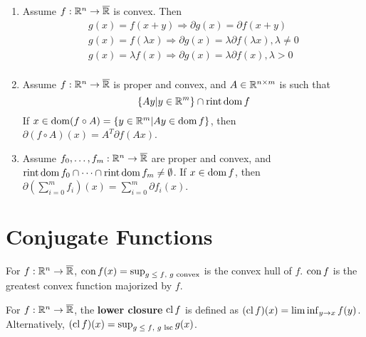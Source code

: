 \begin{thm}
  \label{sec:subgradients-11}
  \begin{enumerate}
  \item Assume $f: \mathbb{R}^{n} \rightarrow \overline {\mathbb{R}}$  is convex. Then
    \begin{align}
      \label{eq:17}
      g(x) = f(x+y) \Rightarrow \partial g(x) = \partial f(x+y) \\
      g(x) = f(\lambda x) \Rightarrow \partial g(x) = \lambda \partial
      f(\lambda x), \lambda \neq 0 \\
      \label{eq:19}
      g(x) = \lambda f(x) \Rightarrow \partial g(x) = \lambda \partial
      f(x), \lambda > 0 \\
    \end{align}
  \item Assume $f: \mathbb{R}^{n} \rightarrow \overline {\mathbb{R}}$ is proper and
    convex, and $A \in \mathbb{R}^{n \times m}$ is such that
    \begin{equation}
      \label{eq:21}
      \{ Ay | y \in \mathbb{R}^{m} \}  \cap \operatorname*{rint} \operatorname*{dom} f
    \end{equation}
    If $x \in \operatorname*{dom} (f \circ A) = \{ y \in \mathbb{R}^{m} | Ay \in \operatorname*{dom} f \} $,
    then $\partial (f \circ A)(x) = A^{T} \partial f(Ax)$.
  \item Assume $f_{0}, \dots, f_{m}: \mathbb{R}^{n} \rightarrow \overline {\mathbb{R}}$
    are proper and convex, and $\operatorname*{rint} \operatorname*{dom} f_{0} \cap \dots \cap \operatorname*{rint}
    \operatorname*{dom} f_{m} \neq \emptyset$.  If $x \in \operatorname*{dom} f$, then
    $\partial(\sum_{i=0}^{m} f_{i})(x) = \sum_{i=0}^{m} \partial f_{i}(x)$.
  \end{enumerate}
\end{thm}

\section{Conjugate Functions}
\label{sec:conjugate-functions}

\begin{defn}
  \label{sec:conjugate-functions-1}
  For $f: \mathbb{R}^{n} \rightarrow \overline {\mathbb{R}}$, $\operatorname*{con} f(x) =\sup_{\text{$g
      \leq f$, $g$ convex}}$ is the convex hull of $f$.
  $\operatorname*{con} f$ is the greatest convex function majorized by $f$.
\end{defn}

\begin{defn}
  \label{sec:conjugate-functions-2}
  For $f: \mathbb{R}^{n} \rightarrow \overline {\mathbb{R}}$, the \textbf{lower closure}
  $\operatorname*{cl} f$ is defined as $(\operatorname*{cl} f)(x) = \liminf_{y \rightarrow x} f(y)$.
  Alternatively, $(\operatorname*{cl} f)(x) = \sup_{\text{$g \leq f$, $g$ lsc}} g(x)$.
\end{defn}

